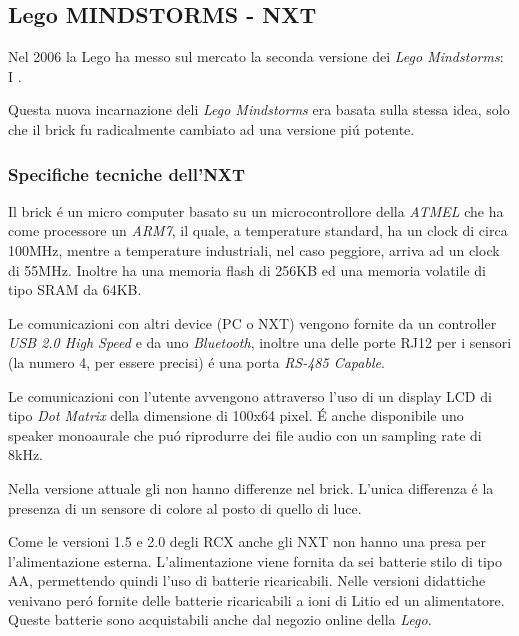 \subsection{Lego MINDSTORMS - NXT}
Nel 2006 la Lego ha messo sul mercato la seconda versione dei \emph{Lego
Mindstorms}: I \nxt{}.

Questa nuova incarnazione deli \emph{Lego Mindstorms} era basata sulla
stessa idea, solo che il brick fu radicalmente cambiato ad una versione
pi\'u potente.

\subsubsection{Specifiche tecniche dell'NXT}
Il brick \'e un micro computer basato su un microcontrollore della
\emph{ATMEL} che ha come processore un \emph{ARM7}, il quale, a temperature
standard, ha un clock di circa 100MHz, mentre a temperature industriali,
nel caso peggiore, arriva ad un clock di 55MHz. Inoltre ha una memoria
flash di 256KB ed una memoria volatile di tipo SRAM da 64KB.

Le comunicazioni con altri device (PC o NXT) vengono fornite da un
controller \emph{USB 2.0 High Speed} e da uno \emph{Bluetooth}, inoltre una
delle porte RJ12 per i sensori (la numero 4, per essere precisi) \'e una
porta \emph{RS-485 Capable}.

Le comunicazioni con l'utente avvengono attraverso l'uso di un display LCD
di tipo \emph{Dot Matrix} della dimensione di 100x64 pixel. \'E anche
disponibile uno speaker monoaurale che pu\'o riprodurre dei file audio con
un sampling rate di 8kHz.

Nella versione attuale gli \nxt{} non hanno differenze nel brick. L'unica
differenza \'e la presenza di un sensore di colore al posto di quello di
luce.

Come le versioni 1.5 e 2.0 degli RCX anche gli NXT non hanno una presa per
l'alimentazione esterna. L'alimentazione viene fornita da sei batterie
stilo di tipo AA, permettendo quindi l'uso di batterie ricaricabili. Nelle
versioni didattiche venivano per\'o fornite delle batterie ricaricabili a
ioni di Litio ed un alimentatore. Queste batterie sono acquistabili anche
dal negozio online della \emph{Lego}.

